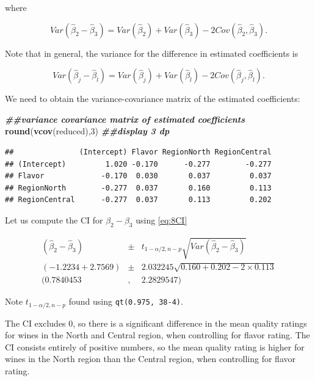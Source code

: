 \documentclass[
]{book}
\newenvironment{Shaded}{\begin{snugshade}}{\end{snugshade}}
\newcommand{\DecValTok}[1]{\textcolor[rgb]{0.00,0.00,0.81}{#1}}
\newcommand{\DocumentationTok}[1]{\textcolor[rgb]{0.56,0.35,0.01}{\textbf{\textit{#1}}}}
\newcommand{\FunctionTok}[1]{\textcolor[rgb]{0.13,0.29,0.53}{\textbf{#1}}}
\newcommand{\NormalTok}[1]{#1}
\begin{document}
where

\[
Var\left(\hat{\beta}_2-\hat{\beta}_3\right) = Var\left(\hat{\beta}_2\right) + Var\left(\hat{\beta}_3\right) - 2 Cov(\hat{\beta}_2, \hat{\beta}_3).
\]

Note that in general, the variance for the difference in estimated coefficients is

\begin{equation} 
Var\left(\hat{\beta}_j-\hat{\beta}_l\right) = Var\left(\hat{\beta}_j\right) + Var\left(\hat{\beta}_l\right) - 2 Cov(\hat{\beta}_j, \hat{\beta}_l).
\label{eq:8diff}
\end{equation}

We need to obtain the variance-covariance matrix of the estimated coefficients:

\begin{Shaded}
\begin{Highlighting}[]
\DocumentationTok{\#\#variance covariance matrix of estimated coefficients}
\FunctionTok{round}\NormalTok{(}\FunctionTok{vcov}\NormalTok{(reduced),}\DecValTok{3}\NormalTok{) }\DocumentationTok{\#\#display 3 dp}
\end{Highlighting}
\end{Shaded}

\begin{verbatim}
##               (Intercept) Flavor RegionNorth RegionCentral
## (Intercept)         1.020 -0.170      -0.277        -0.277
## Flavor             -0.170  0.030       0.037         0.037
## RegionNorth        -0.277  0.037       0.160         0.113
## RegionCentral      -0.277  0.037       0.113         0.202
\end{verbatim}

Let us compute the CI for \(\beta_2 - \beta_3\) using \eqref{eq:8CI}

\begin{eqnarray*}
(\hat{\beta}_2-\hat{\beta}_3) &\pm&
t_{1-\alpha/2,n-p}\sqrt{Var\left(\hat{\beta}_2-\hat{\beta}_3\right)} \nonumber \\
(-1.2234 + 2.7569) &\pm& 2.032245 \sqrt{0.160 + 0.202 - 2 \times 0.113} \nonumber \\
(0.7840453&,& 2.2829547) \nonumber
\end{eqnarray*}

Note \(t_{1-\alpha/2,n-p}\) found using \texttt{qt(0.975,\ 38-4)}.

The CI excludes 0, so there is a significant difference in the mean quality ratings for wines in the North and Central region, when controlling for flavor rating. The CI consists entirely of positive numbers, so the mean quality rating is higher for wines in the North region than the Central region, when controlling for flavor rating.
\end{document}
